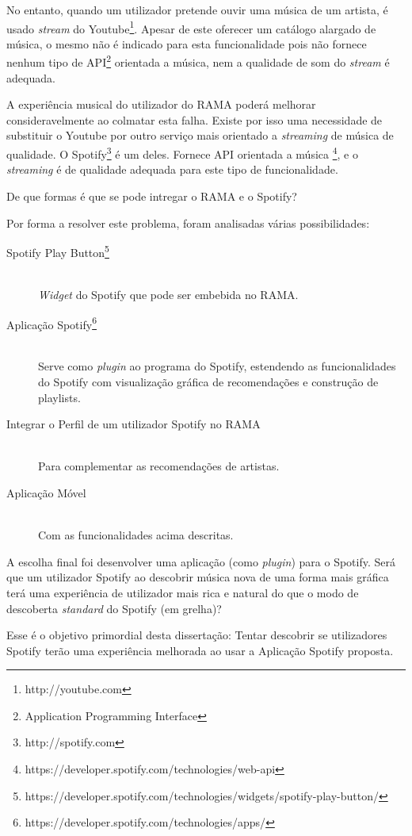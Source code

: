 No entanto, quando um utilizador pretende ouvir uma música de um artista, é usado \emph{stream} do Youtube\footnote{http://youtube.com}. 
Apesar de este oferecer um catálogo alargado de música, o mesmo não é indicado para esta funcionalidade pois não fornece nenhum tipo de API\footnote{Application Programming Interface} orientada a música, nem a qualidade de som do \emph{stream} é adequada.

A experiência musical do utilizador do RAMA poderá melhorar consideravelmente ao colmatar esta falha.
Existe por isso uma necessidade de substituir o Youtube por outro serviço mais orientado a \emph{streaming} de música de qualidade.
O Spotify\footnote{http://spotify.com} é um deles. Fornece API orientada a música \footnote{https://developer.spotify.com/technologies/web-api}, e o \emph{streaming} é de qualidade adequada para este tipo de funcionalidade.

De que formas é que se pode intregar o RAMA e o Spotify?

Por forma a resolver este problema, foram analisadas várias possibilidades:

\begin{description}
  \item[Spotify Play Button\footnote{https://developer.spotify.com/technologies/widgets/spotify-play-button/}] \hfill \\
    \emph{Widget} do Spotify que pode ser embebida no RAMA.
  \item[Aplicação Spotify\footnote{https://developer.spotify.com/technologies/apps/}] \hfill \\
    Serve como \emph{plugin} ao programa do Spotify, estendendo as funcionalidades do Spotify com visualização gráfica de recomendações e construção de playlists.
  \item[Integrar o Perfil de um utilizador Spotify no RAMA] \hfill \\
    Para complementar as recomendações de artistas.
  \item[Aplicação Móvel] \hfill \\
    Com as funcionalidades acima descritas.
\end{description}


A escolha final foi desenvolver uma aplicação (como \emph{plugin}) para o Spotify.
Será que um utilizador Spotify ao descobrir música nova de uma forma mais gráfica terá uma experiência de utilizador mais rica e natural do que o modo de descoberta \emph{standard} do Spotify (em grelha)?

Esse é o objetivo primordial desta dissertação: Tentar descobrir se utilizadores Spotify terão uma experiência melhorada ao usar a Aplicação Spotify proposta.

